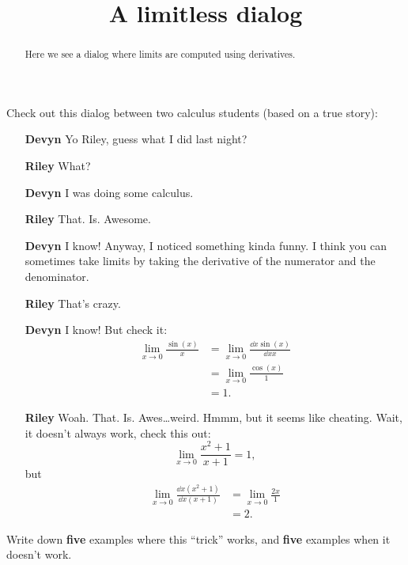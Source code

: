\documentclass{ximera}
\title[Break-Ground:]{A limitless dialog}
\begin{document}
\begin{abstract}
Here we see a dialog where limits are computed using derivatives.
\end{abstract}
\maketitle

Check out this dialog between two calculus students (based on a true
story):

\begin{itemize}
\item[\textbf{Devyn}] Yo Riley, guess what I did last night?
\item[\textbf{Riley}] What?
\item[\textbf{Devyn}] I was doing some calculus.
\item[\textbf{Riley}] That. Is. Awesome.
\item[\textbf{Devyn}] I know! Anyway, I noticed something kinda funny. I
  think you can sometimes take limits by taking the derivative of the
  numerator and the denominator.
\item[\textbf{Riley}] That's crazy.
\item[\textbf{Devyn}] I know! But check it:
  \begin{align*}
    \lim_{x\to 0} \frac{\sin(x)}{x} &= \lim_{x\to 0} \frac{\dd{x}\sin(x)}{\dd{x}x}\\
    &= \lim_{x\to 0} \frac{\cos(x)}{1}\\
    &=1.
  \end{align*}
  \item[\textbf{Riley}] Woah. That. Is. Awes\dots weird. Hmmm, but it seems like
    cheating. Wait, it doesn't always work, check this out:
    \[
    \lim_{x\to 0} \frac{x^2+1}{x+1} = 1,
    \]
    but
    \begin{align*}
      \lim_{x\to 0} \frac{\dd{x}\left(x^2+1\right)}{\dd{x}\left(x+1\right)} &=
      \lim_{x\to 0} \frac{2x}{1} \\
      &=2.
    \end{align*}
\end{itemize}

\begin{problem}
  Write down \textbf{five} examples where this ``trick'' works, and
  \textbf{five} examples when it doesn't work.
  \begin{freeResponse}
\end{freeResponse}
\end{problem}
\end{document}
